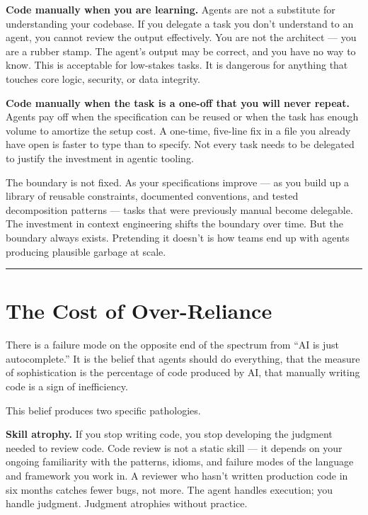 \documentclass[
  a4paper,
  DIV=11,
  numbers=noendperiod]{scrreprt}
\begin{document}
\textbf{Code manually when you are learning.} Agents are not a
substitute for understanding your codebase. If you delegate a task you
don't understand to an agent, you cannot review the output effectively.
You are not the architect --- you are a rubber stamp. The agent's output
may be correct, and you have no way to know. This is acceptable for
low-stakes tasks. It is dangerous for anything that touches core logic,
security, or data integrity.

\textbf{Code manually when the task is a one-off that you will never
repeat.} Agents pay off when the specification can be reused or when the
task has enough volume to amortize the setup cost. A one-time, five-line
fix in a file you already have open is faster to type than to specify.
Not every task needs to be delegated to justify the investment in
agentic tooling.

The boundary is not fixed. As your specifications improve --- as you
build up a library of reusable constraints, documented conventions, and
tested decomposition patterns --- tasks that were previously manual
become delegable. The investment in context engineering shifts the
boundary over time. But the boundary always exists. Pretending it
doesn't is how teams end up with agents producing plausible garbage at
scale.

\begin{center}\rule{0.5\linewidth}{0.5pt}\end{center}

\section{The Cost of Over-Reliance}\label{the-cost-of-over-reliance}

There is a failure mode on the opposite end of the spectrum from ``AI is
just autocomplete.'' It is the belief that agents should do everything,
that the measure of sophistication is the percentage of code produced by
AI, that manually writing code is a sign of inefficiency.

This belief produces two specific pathologies.

\textbf{Skill atrophy.} If you stop writing code, you stop developing
the judgment needed to review code. Code review is not a static skill
--- it depends on your ongoing familiarity with the patterns, idioms,
and failure modes of the language and framework you work in. A reviewer
who hasn't written production code in six months catches fewer bugs, not
more. The agent handles execution; you handle judgment. Judgment
atrophies without practice.
\end{document}
